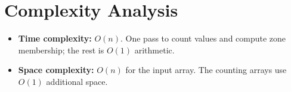 \documentclass[11pt,a4paper]{article}
\begin{document}
\section{Complexity Analysis}

\begin{itemize}
  \item \textbf{Time complexity:} $O(n)$. One pass to count values and compute zone
        membership; the rest is $O(1)$ arithmetic.
  \item \textbf{Space complexity:} $O(n)$ for the input array. The counting arrays
        use $O(1)$ additional space.
\end{itemize}
\end{document}
